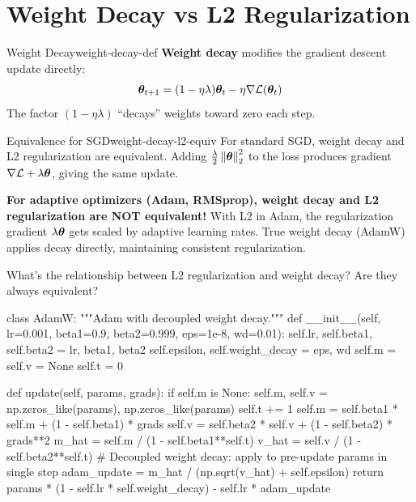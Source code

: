 \documentclass[../../main.tex]{subfiles}
\begin{document}
\section{Weight Decay vs L2 Regularization}
\label{sec:weight-decay}

\begin{definition}{Weight Decay}{weight-decay-def}
\textbf{Weight decay} modifies the gradient descent update directly:
\[
    \boldsymbol{\theta}_{t+1} = (1 - \eta\lambda)\boldsymbol{\theta}_t - \eta\nabla\mathcal{L}(\boldsymbol{\theta}_t)
\]
The factor $(1 - \eta\lambda)$ ``decays'' weights toward zero each step.
\end{definition}

\begin{theorem}{Equivalence for SGD}{weight-decay-l2-equiv}
For standard SGD, weight decay and L2 regularization are equivalent. Adding $\frac{\lambda}{2}\left\lVert \boldsymbol{\theta} \right\rVert_2^2$ to the loss produces gradient $\nabla\mathcal{L} + \lambda\boldsymbol{\theta}$, giving the same update.
\end{theorem}

\begin{important}
\textbf{For adaptive optimizers (Adam, RMSprop), weight decay and L2 regularization are NOT equivalent!} With L2 in Adam, the regularization gradient $\lambda\boldsymbol{\theta}$ gets scaled by adaptive learning rates. True weight decay (AdamW) applies decay directly, maintaining consistent regularization.
\end{important}

\begin{checkpoint}
What's the relationship between L2 regularization and weight decay? Are they always equivalent?
\end{checkpoint}

\begin{pythoncode}
class AdamW:
    """Adam with decoupled weight decay."""
    def __init__(self, lr=0.001, beta1=0.9, beta2=0.999, eps=1e-8, wd=0.01):
        self.lr, self.beta1, self.beta2 = lr, beta1, beta2
        self.epsilon, self.weight_decay = eps, wd
        self.m = self.v = None
        self.t = 0

    def update(self, params, grads):
        if self.m is None:
            self.m, self.v = np.zeros_like(params), np.zeros_like(params)
        self.t += 1
        self.m = self.beta1 * self.m + (1 - self.beta1) * grads
        self.v = self.beta2 * self.v + (1 - self.beta2) * grads**2
        m_hat = self.m / (1 - self.beta1**self.t)
        v_hat = self.v / (1 - self.beta2**self.t)
        # Decoupled weight decay: apply to pre-update params in single step
        adam_update = m_hat / (np.sqrt(v_hat) + self.epsilon)
        return params * (1 - self.lr * self.weight_decay) - self.lr * adam_update
\end{pythoncode}
\end{document}
